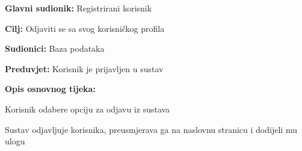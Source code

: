 			\noindent {}
		\begin{packed_item}
			
			\item \textbf{Glavni sudionik: }$ $Registrirani korisnik $ $
			\item  \textbf{Cilj:} $ $Odjaviti se sa svog korisničkog profila$ $
			\item  \textbf{Sudionici:} $ $Baza podataka$ $
			\item  \textbf{Preduvjet:} $ $Korisnik je prijavljen u sustav$ $
			\item  \textbf{Opis osnovnog tijeka:}
			
			\item[] \begin{packed_enum}
				
				\item $ $Korisnik odabere opciju za odjavu iz sustava$ $
				\item $ $Sustav odjavljuje korisnika, preusmjerava ga na naslovnu stranicu i dodijeli mu ulogu $ $
				
			\end{packed_enum}
		\end{packed_item}
		
